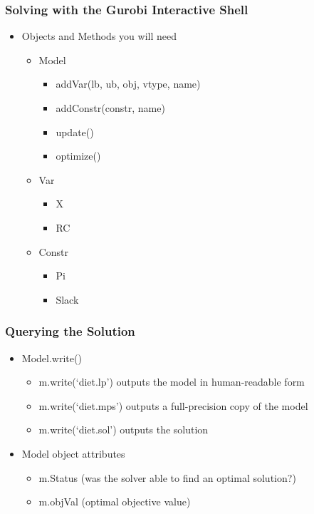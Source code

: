 \documentclass[12pt,handout]{beamer}
\begin{document}
\begin{frame}
\frametitle{Solving with the Gurobi Interactive Shell}
\begin{itemize}
\item Objects and Methods you will need
    \begin{itemize}
    \item Model
        \begin{itemize}
        \item addVar(lb, ub, obj, vtype, name)
        \item addConstr(constr, name)
        \item update()
        \item optimize()
        \end{itemize}
    \item Var
        \begin{itemize}
        \item X
        \item RC
        \end{itemize}
    \item Constr
        \begin{itemize}
        \item Pi
        \item Slack
        \end{itemize}
    \end{itemize}
\end{itemize}
\end{frame}

\begin{frame}
\frametitle{Querying the Solution}
\begin{itemize}
\item Model.write()
    \begin{itemize}
    \item m.write(`diet.lp') outputs the model in human-readable form
    \item m.write(`diet.mps') outputs a full-precision copy of the model
    \item m.write(`diet.sol') outputs the solution
    \end{itemize}
\item Model object attributes
    \begin{itemize}
    \item m.Status (was the solver able to find an optimal solution?)
    \item m.objVal (optimal objective value)
    \end{itemize}
\end{itemize}
\end{frame}
\end{document}
